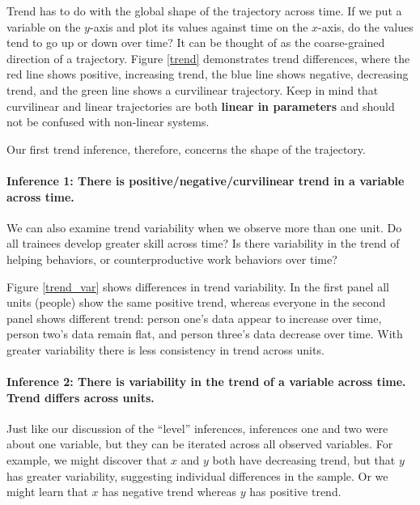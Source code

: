 \documentclass[english,,man]{apa6}
\let\oldparagraph\paragraph
\renewcommand{\paragraph}[1]{\oldparagraph{#1}\mbox{}}
\theoremstyle{definition}
\theoremstyle{definition}
\theoremstyle{definition}
\theoremstyle{remark}
\begin{document}
Trend has to do with the global shape of the trajectory across time. If
we put a variable on the \(y\)-axis and plot its values against time on
the \(x\)-axis, do the values tend to go up or down over time? It can be
thought of as the coarse-grained direction of a trajectory. Figure
\ref{trend} demonstrates trend differences, where the red line shows
positive, increasing trend, the blue line shows negative, decreasing
trend, and the green line shows a curvilinear trajectory. Keep in mind
that curvilinear and linear trajectories are both \textbf{linear in
parameters} and should not be confused with non-linear systems.

Our first trend inference, therefore, concerns the shape of the
trajectory.

\hypertarget{inference-1-there-is-positivenegativecurvilinear-trend-in-a-variable-across-time.}{%
\paragraph{Inference 1: There is positive/negative/curvilinear trend in
a variable across
time.}\label{inference-1-there-is-positivenegativecurvilinear-trend-in-a-variable-across-time.}}

We can also examine trend variability when we observe more than one
unit. Do all trainees develop greater skill across time? Is there
variability in the trend of helping behaviors, or counterproductive work
behaviors over time?

Figure \ref{trend_var} shows differences in trend variability. In the
first panel all units (people) show the same positive trend, whereas
everyone in the second panel shows different trend: person one's data
appear to increase over time, person two's data remain flat, and person
three's data decrease over time. With greater variability there is less
consistency in trend across units.

\hypertarget{inference-2-there-is-variability-in-the-trend-of-a-variable-across-time.-trend-differs-across-units.}{%
\paragraph{Inference 2: There is variability in the trend of a variable
across time. Trend differs across
units.}\label{inference-2-there-is-variability-in-the-trend-of-a-variable-across-time.-trend-differs-across-units.}}

Just like our discussion of the \enquote{level} inferences, inferences
one and two were about one variable, but they can be iterated across all
observed variables. For example, we might discover that \(x\) and \(y\)
both have decreasing trend, but that \(y\) has greater variability,
suggesting individual differences in the sample. Or we might learn that
\(x\) has negative trend whereas \(y\) has positive trend.
\end{document}
